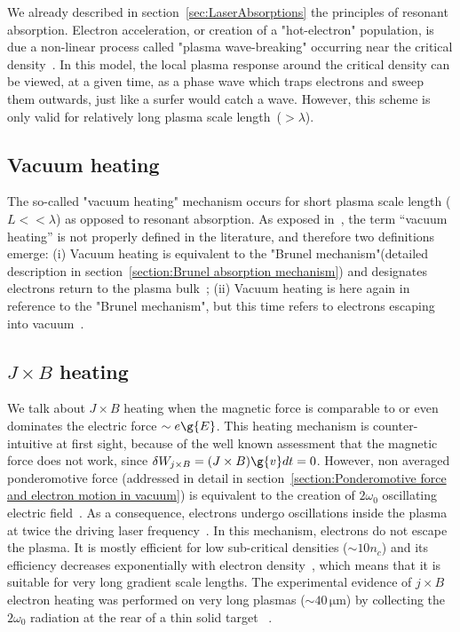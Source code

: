 We already described in section~\ref{sec:LaserAbsorptions} the principles of resonant absorption. Electron acceleration, or creation of a "hot-electron" population, is due a non-linear process called "plasma wave-breaking" occurring near the critical density~\cite{freidberg1972resonant,albritton1975cold}. In this model, the local plasma response around the critical density can be viewed, at a given time, as a phase wave which traps electrons and sweep them outwards, just like a surfer would catch a wave. However, this scheme is only valid for relatively long plasma scale length~($>\lambda$). 

\subsection{Vacuum heating}

The so-called "vacuum heating" mechanism occurs for short plasma scale length ($L << \lambda$) as opposed to resonant absorption. As exposed in~\cite{liseykina2015collisionless}, the term ``vacuum heating'' is not properly defined in the literature, and therefore two definitions emerge: (i) Vacuum heating is equivalent to the  "Brunel mechanism"(detailed description in section~\ref{section:Brunel absorption mechanism}) and designates electrons return to the plasma bulk~\cite{Brunel1987,Gibbon1992,Gibbon1994}; (ii) Vacuum heating is here again in reference to the "Brunel mechanism", but this time refers to electrons escaping into vacuum~\cite{chen2006surface,getz2005vacuum}.



\subsection{$J\times B$ heating}

We talk about $J\times B$ heating when the magnetic force is comparable to or even dominates the electric force $\sim e\g{E}$. This heating mechanism is counter-intuitive at first sight, because of the well known assessment that the magnetic force does not work, since $\delta W_{j\times B} = (J\times B) \g{v}dt= 0$. However, non averaged ponderomotive force (addressed in detail in section~\ref{section:Ponderomotive force and electron motion in vacuum}) is equivalent to the creation of $2\omega_0$ oscillating electric field~\cite{kruer1985j}. As a consequence, electrons undergo oscillations inside the plasma at twice the driving laser frequency~\cite{wilks1997absorption}. In this mechanism, electrons do not escape the plasma.
It is mostly efficient for low sub-critical densities ($\sim 10 n_c$) and its efficiency decreases exponentially with electron density~\cite{denavit1992absorption}, which means that it is suitable for very long gradient scale lengths. The experimental evidence of $j\times B$ electron heating was performed on very long plasmas ($\sim 40\,\mathrm{\mu m}$) by collecting the $2\omega_0$ radiation at the rear of a thin solid target~\cite{baton2003evidence} .




